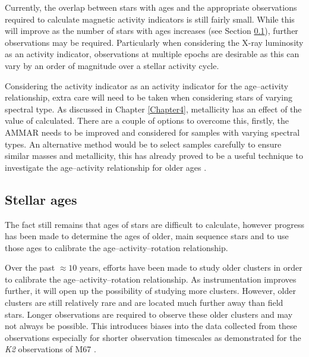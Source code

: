 Currently, the overlap between stars with ages and the appropriate observations required to calculate magnetic activity indicators is still fairly small. While this will improve as the number of stars with ages increases (see Section \ref{Chp6_future_ages}), further observations may be required. Particularly when considering the X-ray luminosity as an activity indicator, observations at multiple epochs are desirable as this can vary by an order of magnitude over a stellar activity cycle.

Considering the \Rprime activity indicator as an activity indicator for the age--activity relationship, extra care will need to be taken when considering stars of varying spectral type. As discussed in Chapter \ref{Chapter4}, metallicity has an effect of the value of \Rprime calculated. There are a couple of options to overcome this, firstly, the AMMAR \citep{Lorenzo_Oliveira_etal_2016} needs to be improved and considered for samples with varying spectral types. An alternative method would be to select samples carefully to ensure similar masses and metallicity, this has already proved to be a useful technique to investigate the age--activity relationship for older ages \citep{dos_Santos_etal_2016,Lorenzo_Oliveira_etal_2018}.

\subsection{Stellar ages}
\label{Chp6_future_ages}

The fact still remains that ages of stars are difficult to calculate, however progress has been made to determine the ages of older, main sequence stars and to use those ages to calibrate the age--activity--rotation relationship.

Over the past $\approx 10$ years, efforts have been made to study older clusters \citet{Meibom_etal_2015, Barnes_etal_2016} in order to calibrate the  age--activity--rotation relationship. As instrumentation improves further, it will open up the possibility of studying more clusters. However, older clusters are still relatively rare and are located much further away than field stars. Longer observations are required to observe these older clusters and may not always be possible. This introduces biases into the data collected from these observations especially for shorter observation timescales as demonstrated for the \textit{K2} observations of M67 \citep{Esselstein_etal_2018}.

